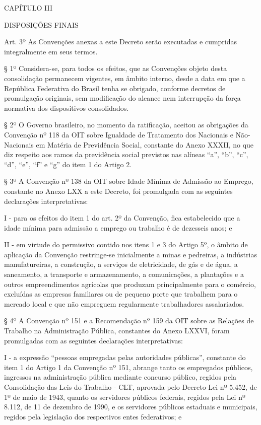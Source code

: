 \documentclass[
]{book}
\begin{document}
CAPÍTULO III

DISPOSIÇÕES FINAIS

Art. 3º As Convenções anexas a este Decreto serão executadas e cumpridas integralmente em seus termos.

§ 1º Considera-se, para todos os efeitos, que as Convenções objeto desta consolidação permanecem vigentes, em âmbito interno, desde a data em que a República Federativa do Brasil tenha se obrigado, conforme decretos de promulgação originais, sem modificação do alcance nem interrupção da força normativa dos dispositivos consolidados.

§ 2º O Governo brasileiro, no momento da ratificação, aceitou as obrigações da Convenção nº 118 da OIT sobre Igualdade de Tratamento dos Nacionais e Não-Nacionais em Matéria de Previdência Social, constante do Anexo XXXII, no que diz respeito aos ramos da previdência social previstos nas alíneas ``a'', ``b'', ``c'', ``d'', ``e'', ``f'' e ``g'' do item 1 do Artigo 2.

§ 3º A Convenção nº 138 da OIT sobre Idade Mínima de Admissão ao Emprego, constante no Anexo LXX a este Decreto, foi promulgada com as seguintes declarações interpretativas:

I - para os efeitos do item 1 do art. 2º da Convenção, fica estabelecido que a idade mínima para admissão a emprego ou trabalho é de dezesseis anos; e

II - em virtude do permissivo contido nos itens 1 e 3 do Artigo 5º, o âmbito de aplicação da Convenção restringe-se inicialmente a minas e pedreiras, a indústrias manufatureiras, a construção, a serviços de eletricidade, de gás e de água, a saneamento, a transporte e armazenamento, a comunicações, a plantações e a outros empreendimentos agrícolas que produzam principalmente para o comércio, excluídas as empresas familiares ou de pequeno porte que trabalhem para o mercado local e que não empreguem regularmente trabalhadores assalariados.

§ 4º A Convenção nº 151 e a Recomendação nº 159 da OIT sobre as Relações de Trabalho na Administração Pública, constantes do Anexo LXXVI, foram promulgadas com as seguintes declarações interpretativas:

I - a expressão ``pessoas empregadas pelas autoridades públicas'', constante do item 1 do Artigo 1 da Convenção nº 151, abrange tanto os empregados públicos, ingressos na administração pública mediante concurso público, regidos pela Consolidação das Leis do Trabalho - CLT, aprovada pelo Decreto-Lei nº 5.452, de 1º de maio de 1943, quanto os servidores públicos federais, regidos pela Lei nº 8.112, de 11 de dezembro de 1990, e os servidores públicos estaduais e municipais, regidos pela legislação dos respectivos entes federativos; e
\end{document}
